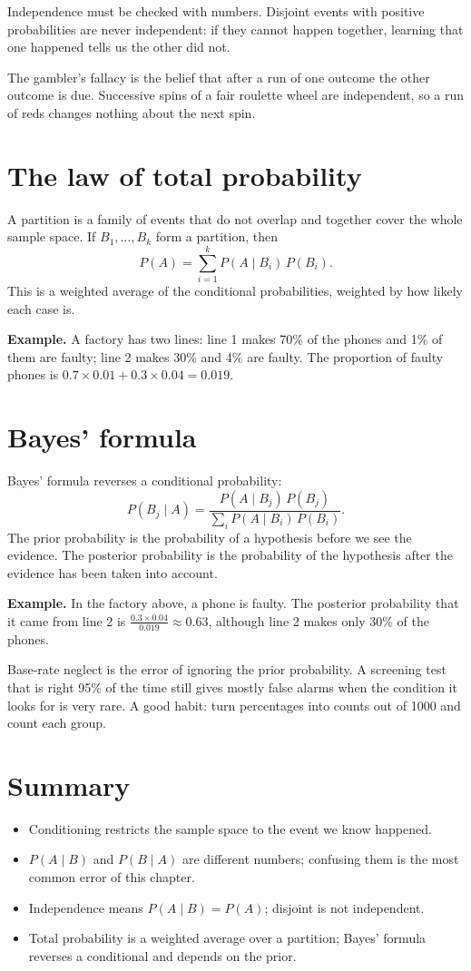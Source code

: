 \documentclass[11pt,a4paper]{article}
\begin{document}
Independence must be checked with numbers. Disjoint events with positive probabilities are never independent: if they cannot happen together, learning that one happened tells us the other did not.

The gambler's fallacy is the belief that after a run of one outcome the other outcome is due. Successive spins of a fair roulette wheel are independent, so a run of reds changes nothing about the next spin.

\section{The law of total probability}

A partition is a family of events that do not overlap and together cover the whole sample space. If $B_1, \dots, B_k$ form a partition, then
\[ P(A) = \sum_{i=1}^{k} P(A \mid B_i)\,P(B_i). \]
This is a weighted average of the conditional probabilities, weighted by how likely each case is.

\textbf{Example.} A factory has two lines: line 1 makes 70\% of the phones and 1\% of them are faulty; line 2 makes 30\% and 4\% are faulty. The proportion of faulty phones is $0.7 \times 0.01 + 0.3 \times 0.04 = 0.019$.

\section{Bayes' formula}

Bayes' formula reverses a conditional probability:
\[ P(B_j \mid A) = \frac{P(A \mid B_j)\,P(B_j)}{\sum_i P(A \mid B_i)\,P(B_i)}. \]
The prior probability is the probability of a hypothesis before we see the evidence. The posterior probability is the probability of the hypothesis after the evidence has been taken into account.

\textbf{Example.} In the factory above, a phone is faulty. The posterior probability that it came from line 2 is $\frac{0.3 \times 0.04}{0.019} \approx 0.63$, although line 2 makes only 30\% of the phones.

Base-rate neglect is the error of ignoring the prior probability. A screening test that is right 95\% of the time still gives mostly false alarms when the condition it looks for is very rare. A good habit: turn percentages into counts out of 1000 and count each group.

\section{Summary}

\begin{itemize}
\item Conditioning restricts the sample space to the event we know happened.
\item $P(A \mid B)$ and $P(B \mid A)$ are different numbers; confusing them is the most common error of this chapter.
\item Independence means $P(A \mid B) = P(A)$; disjoint is not independent.
\item Total probability is a weighted average over a partition; Bayes' formula reverses a conditional and depends on the prior.
\end{itemize}
\end{document}
